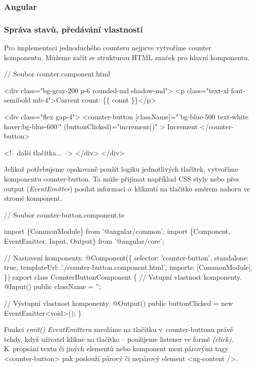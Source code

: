 \subsubsection{Angular}

\subsubsection*{Správa stavů, předávání vlastností}

Pro implementaci jednoduchého counteru nejprve vytvoříme counter komponentu. Můžeme začít se strukturou HTML značek pro hlavní komponentu.

\begin{prog}
// Soubor counter.component.html

<div class="bg-gray-200 p-6 rounded-md shadow-md">
  <p class="text-xl font-semibold mb-4">Current count: \{\{ count \}\}</p>

  <div class="flex gap-4">
    <counter-button
      [className]="'bg-blue-500 text-white hover:bg-blue-600'"
      (buttonClicked)="increment()"
    >
      Increment
    </counter-button>

    <!-- další tlačítka... -->
  </div>
</div>
\end{prog}

Jelikož potřebujeme opakovaně použít logiku jednotlivých tlačítek, vytvoříme komponentu counter-button. 
Ta může přijímat například CSS styly nebo přes output (\emph{EventEmitter}) posílat informaci o~kliknutí na tlačítko směrem nahoru ve stromě komponent.

\begin{prog}
// Soubor counter-button.component.ts

import \{CommonModule\} from '@angular/common';
import \{Component, EventEmitter, Input, Output\} from '@angular/core';

// Nastavení komponenty.
@Component(\{
  selector: 'counter-button',
  standalone: true,
  templateUrl: './counter-button.component.html',
  imports: [CommonModule],
\})
export class CounterButtonComponent \{
  // Vstupní vlastnost komponenty.
  @Input() public className = '';

  // Výstupní vlastnost komponenty.
  @Output() public buttonClicked = new EventEmitter<void>();
\}
\end{prog}

Funkci \emph{emit()} \emph{EventEmitteru} zavoláme na tlačítku v~counter-buttonu právě tehdy, když uživatel klikne na tlačítko -- použijeme listener ve formě \emph{(click)}. 
K~propsání textu či jiných elementů nebo komponent mezi párovými tagy <counter-button> pak poslouží párový či nepárový element <ng-content />.

